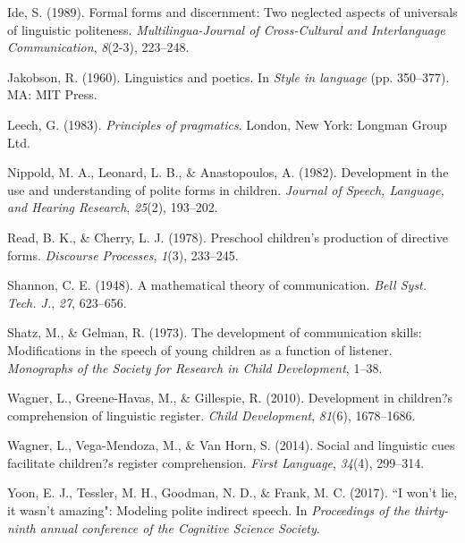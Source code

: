 \documentclass[10pt, letterpaper]{article}
\begin{document}
\hypertarget{ref-ide1989}{}
Ide, S. (1989). Formal forms and discernment: Two neglected aspects of
universals of linguistic politeness. \emph{Multilingua-Journal of
Cross-Cultural and Interlanguage Communication}, \emph{8}(2-3),
223--248.

\hypertarget{ref-jakobson1960}{}
Jakobson, R. (1960). Linguistics and poetics. In \emph{Style in
language} (pp. 350--377). MA: MIT Press.

\hypertarget{ref-leech1983}{}
Leech, G. (1983). \emph{Principles of pragmatics}. London, New York:
Longman Group Ltd.

\hypertarget{ref-nippold1982}{}
Nippold, M. A., Leonard, L. B., \& Anastopoulos, A. (1982). Development
in the use and understanding of polite forms in children. \emph{Journal
of Speech, Language, and Hearing Research}, \emph{25}(2), 193--202.

\hypertarget{ref-read1978}{}
Read, B. K., \& Cherry, L. J. (1978). Preschool children's production of
directive forms. \emph{Discourse Processes}, \emph{1}(3), 233--245.

\hypertarget{ref-shannon1948}{}
Shannon, C. E. (1948). A mathematical theory of communication.
\emph{Bell Syst. Tech. J.}, \emph{27}, 623--656.

\hypertarget{ref-shatz1973}{}
Shatz, M., \& Gelman, R. (1973). The development of communication
skills: Modifications in the speech of young children as a function of
listener. \emph{Monographs of the Society for Research in Child
Development}, 1--38.

\hypertarget{ref-wagner2010}{}
Wagner, L., Greene-Havas, M., \& Gillespie, R. (2010). Development in
children?s comprehension of linguistic register. \emph{Child
Development}, \emph{81}(6), 1678--1686.

\hypertarget{ref-wagner2014}{}
Wagner, L., Vega-Mendoza, M., \& Van Horn, S. (2014). Social and
linguistic cues facilitate children?s register comprehension.
\emph{First Language}, \emph{34}(4), 299--314.

\hypertarget{ref-yoon2017}{}
Yoon, E. J., Tessler, M. H., Goodman, N. D., \& Frank, M. C. (2017). ``I
won't lie, it wasn't amazing": Modeling polite indirect speech. In
\emph{Proceedings of the thirty-ninth annual conference of the Cognitive
Science Society}.


\end{document}
